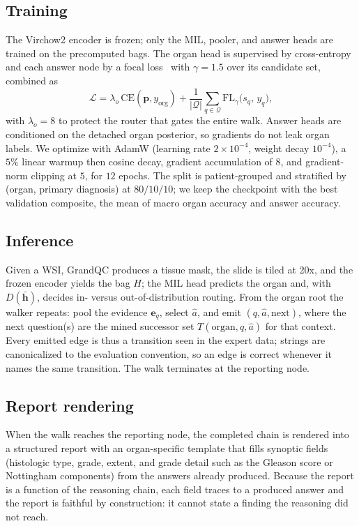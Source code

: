 \documentclass[runningheads]{llncs}
\begin{document}
\subsection{Training}
\label{sec:train}
The Virchow2 encoder is frozen; only the MIL, pooler, and answer heads are trained on the precomputed bags. The
organ head is supervised by cross-entropy and each answer node by a focal loss~\cite{focal} with $\gamma{=}1.5$
over its candidate set, combined as
\begin{equation}
\mathcal{L}=\lambda_o\,\mathrm{CE}(\mathbf{p},y_{\mathrm{org}})
+\frac{1}{|\mathcal{Q}|}\sum_{q\in\mathcal{Q}}\mathrm{FL}_{\gamma}\big(s_q,\,y_q\big),
\end{equation}
with $\lambda_o{=}8$ to protect the router that gates the entire walk. Answer heads are conditioned on the
detached organ posterior, so gradients do not leak organ labels. We optimize with AdamW (learning rate
$2\times10^{-4}$, weight decay $10^{-4}$), a $5\%$ linear warmup then cosine decay, gradient accumulation of $8$,
and gradient-norm clipping at $5$, for $12$ epochs. The split is patient-grouped and stratified by (organ,
primary diagnosis) at $80/10/10$; we keep the checkpoint with the best validation composite, the mean of macro
organ accuracy and answer accuracy.

\subsection{Inference}
Given a WSI, GrandQC produces a tissue mask, the slide is tiled at 20x, and the frozen encoder yields the bag
$H$; the MIL head predicts the organ and, with $D(\bar{\mathbf{h}})$, decides in- versus out-of-distribution
routing. From the organ root the walker repeats: pool the evidence $\mathbf{e}_q$, select $\hat a$, and emit
$(q,\hat a,\text{next})$, where the next question(s) are the mined successor set $T(\text{organ},q,\hat a)$ for
that context. Every emitted edge is thus a transition seen in the expert data; strings are canonicalized to the
evaluation convention, so an edge is correct whenever it names the same transition. The walk terminates at the
reporting node.

\subsection{Report rendering}
When the walk reaches the reporting node, the completed chain is rendered into a structured report with an
organ-specific template that fills synoptic fields (histologic type, grade, extent, and grade detail such as the
Gleason score or Nottingham components) from the answers already produced. Because the report is a function of
the reasoning chain, each field traces to a produced answer and the report is faithful by construction: it cannot
state a finding the reasoning did not reach.
\end{document}
